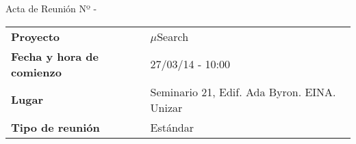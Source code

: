 \begin{center}	
\Large{Acta de Reunión Nº \numeroDeReunion\hspace{0.25em}-\hspace{0.25em}\tituloReunion}
\end{center}
\vspace{1.5em}

\begin{longtable}{ | L{\tabcolsep} |
				     L{\tabcolsep} | }
\hline %
  \\
\hline %
{\bf Proyecto} & $\mu$Search \\ 
\hline %
{\bf Fecha y hora de comienzo} & 27/03/14 - 10:00 \\
\hline %
{\bf Lugar} & Seminario 21, Edif. Ada Byron. EINA. Unizar \\
\hline %
{\bf Tipo de reunión} & Estándar \\
\hline %
\end{longtable}



